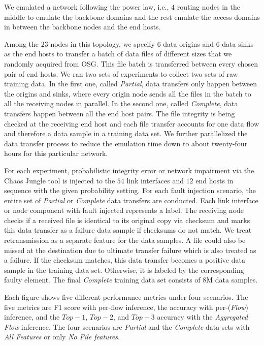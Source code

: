 We emulated a network following the power law, i.e., $4$ routing 
nodes in the middle to emulate the backbone domains and the rest emulate the access domains in between the backbone nodes and the end hosts. 

Among the $23$ nodes in this topology, we specify $6$ data origins and $6$ data sinks as the end hosts to transfer a batch of data files of different sizes that we randomly acquired from OSG. 
This file batch is transferred between every chosen pair of end hosts. We ran two sets of experiments to collect two sets of raw training data. In the first one, called {\it Partial},
data transfers only happen between the origins and sinks, where every origin node sends all the files in the batch 
to all the receiving nodes in parallel. In the second one, called {\it Complete}, data transfers happen between all the end host pairs. 
The file integrity is being checked at the receiving end host and each file transfer accounts for one data flow and therefore 
a data sample in a training data set. We further parallelized the data transfer process to reduce the emulation time down to about twenty-four hours for this particular network.  

For each experiment, probabilistic integrity error or network impairment via the Chaos Jungle tool is injected to the $54$ link interfaces and $12$ end hosts in sequence with the given probability setting.
For each fault injection scenario, the entire set of {\it Partial} or {\it Complete} data transfers are conducted. Each link interface or node component with fault injected represents a label.  
The receiving node checks if a received file is identical to its original copy via checksum and marks this data transfer as a failure data sample if checksums do not match. 
We treat retransmission as a separate feature for the data samples.  A file could also be missed at the destination due to ultimate transfer failure which is also treated as a failure. 
If the checksum matches, this data transfer becomes a positive data sample in the training data set. Otherwise, it is labeled by the corresponding faulty element.
The final {\it Complete} training data set consists of 8{M} data samples.

Each figure shows five different performance metrics under four scenarios. The five metrics are F1 score with per-flow inference, the accuracy with per-({\it Flow}) inference, and the $Top-1$, $Top-2$, and $Top-3$ accuracy with
the {\it Aggregated Flow} inference. The four scenarios are {\it Partial} and the {\it Complete} data sets with {\it All Features} or only {\it No File features}.

